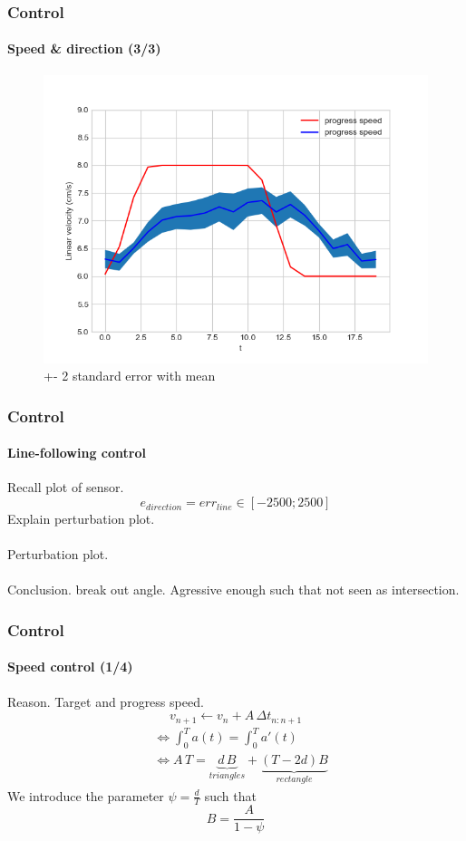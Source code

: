 \documentclass{beamer}
\begin{document}
\begin{frame}
\frametitle{Control}
\framesubtitle{Speed \& direction (3/3)}
\begin{figure}[hbtp]
\centering
\includegraphics[scale=0.4]{figures/pid_speed_shaded.png}
\caption{+- 2 standard error with mean}
\end{figure}
\end{frame}


\begin{frame}
\frametitle{Control}
\framesubtitle{Line-following control}
Recall plot of sensor. 
$$ 
e_{direction} =err_{line} \in [-2500;2500]
$$
Explain perturbation plot.\\~\\
Perturbation plot.\\~\\
Conclusion. break out angle. Agressive enough such that not seen as intersection.
\end{frame}


\begin{frame}
\frametitle{Control}
\framesubtitle{Speed control (1/4)}
Reason. Target and progress speed.
$$
v_{n+1} \leftarrow v_n + A \, \Delta t_{n:n+1}
$$
\begin{align*}
&\Leftrightarrow \int_{0}^{T}a(t) =  \int_{0}^{T}a'(t) \\
&\Leftrightarrow A\,T = \underbrace{d\,B}_{triangles} + \underbrace{(T - 2d)B}_{rectangle}
\end{align*}
We introduce the parameter $\psi = \frac{d}{T}$ such that
$$
\boxed{B = \frac{A}{1-\psi}} 
$$
\end{frame}
\end{document}
